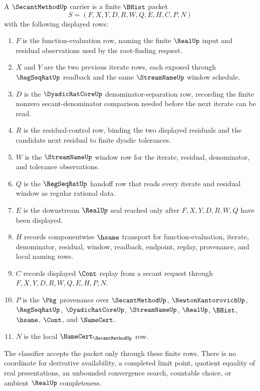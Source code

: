 \begin{definition}
\label{def:secant-method-carrier}
A $\SecantMethodUp$ carrier is a finite $\BHist$ packet
$$
S=(F,X,Y,D,R,W,Q,E,H,C,P,N)
$$
with the following displayed rows:
\begin{enumerate}
\item $F$ is the function-evaluation row, naming the finite $\RealUp$ input and residual observations used by the root-finding request.
\item $X$ and $Y$ are the two previous iterate rows, each exposed through $\RegSeqRatUp$ readback and the same $\StreamNameUp$ window schedule.
\item $D$ is the $\DyadicRatCoreUp$ denominator-separation row, recording the finite nonzero secant-denominator comparison needed before the next iterate can be read.
\item $R$ is the residual-control row, binding the two displayed residuals and the candidate next residual to finite dyadic tolerances.
\item $W$ is the $\StreamNameUp$ window row for the iterate, residual, denominator, and tolerance observations.
\item $Q$ is the $\RegSeqRatUp$ handoff row that reads every iterate and residual window as regular rational data.
\item $E$ is the downstream $\RealUp$ seal reached only after $F,X,Y,D,R,W,Q$ have been displayed.
\item $H$ records componentwise $\hsame$ transport for function-evaluation, iterate, denominator, residual, window, readback, endpoint, replay, provenance, and local naming rows.
\item $C$ records displayed $\Cont$ replay from a secant request through $F,X,Y,D,R,W,Q,E,H,P,N$.
\item $P$ is the $\Pkg$ provenance over $\SecantMethodUp$, $\NewtonKantorovichUp$, $\RegSeqRatUp$, $\DyadicRatCoreUp$, $\StreamNameUp$, $\RealUp$, $\BHist$, $\hsame$, $\Cont$, and $\NameCert$.
\item $N$ is the local $\NameCert_{\SecantMethodUp}$ row.
\end{enumerate}
The classifier accepts the packet only through these finite rows. There is no coordinate for derivative availability, a completed limit point, quotient equality of real presentations, an unbounded convergence search, countable choice, or ambient $\RealUp$ completeness.
\end{definition}

